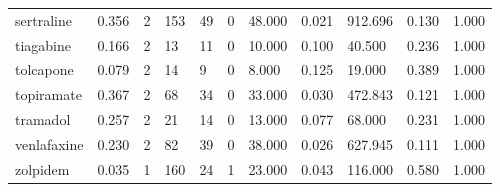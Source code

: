 \documentclass[preprint,11pt]{elsarticle}
\begin{document}
\begin{table}[h]
\begin{tabular}{lllllllllll}
  sertraline & 0.356 & 2 & 153 &   49 & 0 & 48.000 & 0.021 & 912.696 & 0.130 & 1.000 \\ 
  tiagabine & 0.166 & 2 & 13 &   11 & 0 & 10.000 & 0.100 & 40.500 & 0.236 & 1.000 \\ 
  tolcapone & 0.079 & 2 & 14 &    9 & 0 & 8.000 & 0.125 & 19.000 & 0.389 & 1.000 \\ 
  topiramate & 0.367 & 2 & 68 &   34 & 0 & 33.000 & 0.030 & 472.843 & 0.121 & 1.000 \\ 
  tramadol & 0.257 & 2 & 21 &   14 & 0 & 13.000 & 0.077 & 68.000 & 0.231 & 1.000 \\ 
  venlafaxine & 0.230 & 2 & 82 &   39 & 0 & 38.000 & 0.026 & 627.945 & 0.111 & 1.000 \\ 
  zolpidem & 0.035 & 1 & 160 &   24 & 1 & 23.000 & 0.043 & 116.000 & 0.580 & 1.000 \\ 
   \hline
\end{tabular}
\end{table}
 \normalsize
\end{document}
